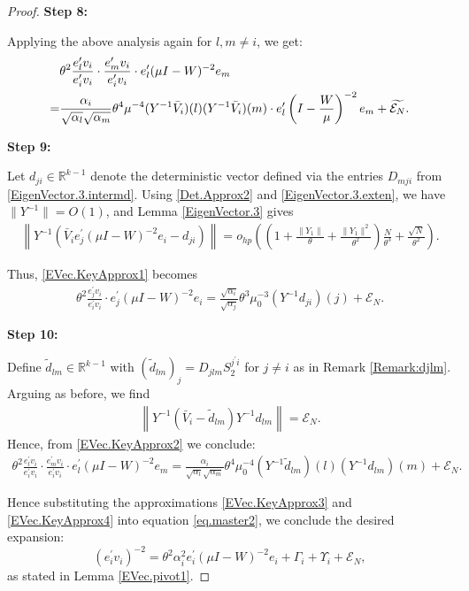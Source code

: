 \documentclass[11pt, reqno]{amsart}
\numberwithin{equation}{section}
\begin{document}
\begin{proof}
\textbf{Step 8:}

Applying the above analysis again for \( l,m \ne i \), we get:
\begin{align}
& \theta^2 \frac{e_l^\prime v_i}{e_i^\prime v_i} \cdot \frac{e_m^\prime v_i}{e_i^\prime v_i} \cdot e_l^\prime (\mu I - W)^{-2} e_m \notag \\
= & \frac{\alpha_i}{\sqrt{\alpha_l}\sqrt{\alpha_m}}\theta^4 \mu^{-4} (Y^{-1} \bar V_i)(l) (Y^{-1} \bar V_i)(m) \cdot e_l^\prime \left(I - \frac{W}{\mu}\right)^{-2} e_m + \widetilde{\mathcal{E}_N}. \label{EVec.KeyApprox2}
\end{align}

\textbf{Step 9:}

Let \( d_{ji} \in \mathbb{R}^{k-1} \) denote the deterministic vector defined via the entries \( D_{mji} \) from \eqref{EigenVector.3.intermd}. Using \eqref{Det.Approx2} and \eqref{EigenVector.3.exten}, we have \( \|Y^{-1}\| = O(1) \), and Lemma \ref{EigenVector.3} gives
\begin{align}
\left\| Y^{-1} \left( \bar V_i e_j^\prime (\mu I - W)^{-2} e_i - d_{ji} \right) \right\| 
= o_{hp} \left( \left(1 + \frac{\|Y_1\|}{\theta} + \frac{\|Y_1\|^2}{\theta^2} \right) \frac{N}{\theta^3} + \frac{\sqrt{N}}{\theta^2} \right).
\end{align}

Thus, \eqref{EVec.KeyApprox1} becomes
\begin{align}
\theta^2 \frac{e_j^\prime v_i}{e_i^\prime v_i} \cdot e_j^\prime (\mu I - W)^{-2} e_i 
= \frac{\sqrt{\alpha_i}}{\sqrt{\alpha_j}}\theta^3 \mu_0^{-3} (Y^{-1} d_{ji})(j) + \mathcal{E}_N. \label{EVec.KeyApprox3}
\end{align}

\textbf{Step 10:}

Define \( \tilde d_{lm} \in \mathbb{R}^{k-1} \) with $(\tilde d_{lm})_{j}= D_{jlm} S_2^{j^\prime i}$ for $j\neq i$ as in Remark \ref{Remark:djlm}. Arguing as before, we find
\begin{align}
\left\| Y^{-1}(\bar V_i - \tilde d_{lm}) Y^{-1} d_{lm} \right\| = \mathcal{E}_N.
\end{align}
Hence, from \eqref{EVec.KeyApprox2} we conclude:
\begin{align}
\theta^2 \frac{e_l^\prime v_i}{e_i^\prime v_i} \cdot \frac{e_m^\prime v_i}{e_i^\prime v_i} \cdot e_l^\prime (\mu I - W)^{-2} e_m 
=\frac{\alpha_i}{\sqrt{\alpha_l}\sqrt{\alpha_m}} \theta^4 \mu_0^{-4} (Y^{-1} \tilde d_{lm})(l) (Y^{-1} d_{lm})(m) + \mathcal{E}_N. \label{EVec.KeyApprox4}
\end{align}


Hence substituting the approximations \eqref{EVec.KeyApprox3} and \eqref{EVec.KeyApprox4} into equation \eqref{eq.master2}, we conclude the desired expansion:
\[
(e_i^\prime v_i)^{-2} = \theta^2 \alpha_i^2 e_i^\prime (\mu I - W)^{-2} e_i + \Gamma_i + \Upsilon_i + \mathcal{E}_N,
\]
as stated in Lemma \ref{EVec.pivot1}.
\end{proof}
\end{document}
